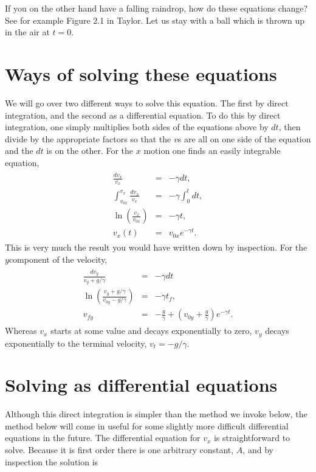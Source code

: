 \documentclass[letterpaper,10pt,english]{sphinxmanual}
\begin{document}
If you on the other hand have a falling raindrop, how do these equations change? See for example Figure 2.1 in Taylor.
Let us stay with a ball which is thrown up in the air at \(t=0\).


\section{Ways of solving these equations}
\label{\detokenize{chapter1:ways-of-solving-these-equations}}
We will go over two different ways to solve this equation. The first
by direct integration, and the second as a differential equation. To
do this by direct integration, one simply multiplies both sides of the
equations above by \(dt\), then divide by the appropriate factors so
that the \(v\)s are all on one side of the equation and the \(dt\) is on
the other. For the \(x\) motion one finds an easily integrable equation,
\begin{equation*}
\begin{split}
\begin{eqnarray}
\frac{dv_x}{v_x}&=&-\gamma dt,\\
\nonumber
\int_{v_{0x}}^{v_{x}}\frac{dv_x}{v_x}&=&-\gamma\int_0^{t}dt,\\
\nonumber
\ln\left(\frac{v_{x}}{v_{0x}}\right)&=&-\gamma t,\\
\nonumber
v_{x}(t)&=&v_{0x}e^{-\gamma t}.
\end{eqnarray}
\end{split}
\end{equation*}
This is very much the result you would have written down
by inspection. For the \(y\)\sphinxhyphen{}component of the velocity,
\begin{equation*}
\begin{split}
\begin{eqnarray}
\frac{dv_y}{v_y+g/\gamma}&=&-\gamma dt\\
\nonumber
\ln\left(\frac{v_{y}+g/\gamma}{v_{0y}-g/\gamma}\right)&=&-\gamma t_f,\\
\nonumber
v_{fy}&=&-\frac{g}{\gamma}+\left(v_{0y}+\frac{g}{\gamma}\right)e^{-\gamma t}.
\end{eqnarray}
\end{split}
\end{equation*}
Whereas \(v_x\) starts at some value and decays
exponentially to zero, \(v_y\) decays exponentially to the terminal
velocity, \(v_t=-g/\gamma\).


\section{Solving as differential equations}
\label{\detokenize{chapter1:solving-as-differential-equations}}
Although this direct integration is simpler than the method we invoke
below, the method below will come in useful for some slightly more
difficult differential equations in the future. The differential
equation for \(v_x\) is straight\sphinxhyphen{}forward to solve. Because it is first
order there is one arbitrary constant, \(A\), and by inspection the
solution is
\end{document}
